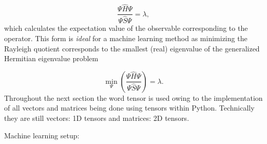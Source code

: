 \documentclass[12pt]{article}
\let\cite=\supercite
\begin{document}
\begin{equation}
  \frac{\Psi \hat{H} \Psi}{\Psi \hat{S} \Psi} = \lambda,
\end{equation}
which calculates the expectation value of the observable corresponding to the operator. This form is \textit{ideal} for a machine learning method as minimizing the Rayleigh quotient corresponds to the smallest (real) eigenvalue of the generalized Hermitian eigenvalue problem\cite{Bai:2018}

\begin{equation}
  \min_\Psi\left(\frac{\Psi \hat{H} \Psi}{\Psi \hat{S} \Psi}\right) = \lambda.
\end{equation}
Throughout the next section the word tensor is used owing to the implementation of all vectors and matrices being done using tensors within Python. Technically they are still vectors: 1D tensors and matrices: 2D tensors.

\vspace{0.5cm}

\noindent Machine learning setup:
\end{document}
